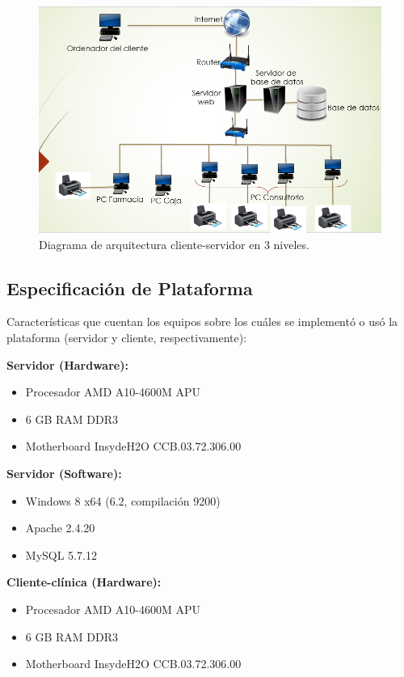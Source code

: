 	\begin{figure}[htbp!]
		\centering
			\includegraphics[width=1.15\textwidth]{images/mod_fis3.png}
		\caption{Diagrama de arquitectura cliente-servidor en 3 niveles.}
	\end{figure}



\subsection{Especificación de Plataforma}
Caracter\'isticas que cuentan los equipos sobre los cu\'ales se implement\'o o us\'o la plataforma (servidor y cliente, respectivamente):


\bfseries Servidor (Hardware): \mdseries
\begin{itemize}
\item Procesador AMD A10-4600M APU
\item 6 GB RAM DDR3
\item Motherboard InsydeH2O CCB.03.72.306.00
\end{itemize}

\bfseries Servidor (Software): \mdseries
\begin{itemize}
\item Windows 8 x64 (6.2, compilaci\'on 9200)
\item Apache 2.4.20
\item MySQL 5.7.12
\end{itemize}

\bfseries Cliente-cl\'inica (Hardware): \mdseries
\begin{itemize}
\item Procesador AMD A10-4600M APU
\item 6 GB RAM DDR3
\item Motherboard InsydeH2O CCB.03.72.306.00
\end{itemize}

